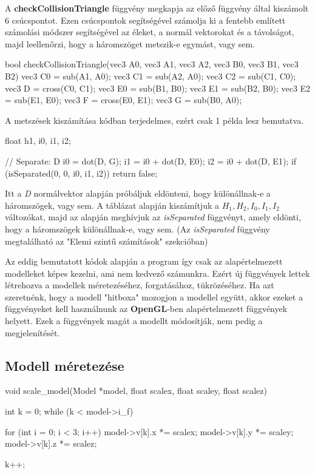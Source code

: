 \newpage

A \textbf{checkCollisionTriangle} függvény megkapja az előző függvény által kiszámolt 6 csúcspontot. Ezen csúcspontok segítségével számolja ki a fentebb említett számolási módszer segítségével az éleket, a normál vektorokat és a távolságot, majd leellenőrzi, hogy a háromszöget metszik-e egymást, vagy sem.

\begin{cpp}
bool checkCollisionTriangle(vec3 A0, vec3 A1, vec3 A2, vec3 B0,
vec3 B1, vec3 B2)
{
    vec3 C0 = sub(A1, A0);
    vec3 C1 = sub(A2, A0);
    vec3 C2 = sub(C1, C0);
    vec3 D = cross(C0, C1);
    vec3 E0 = sub(B1, B0);
    vec3 E1 = sub(B2, B0);
    vec3 E2 = sub(E1, E0);
    vec3 F = cross(E0, E1);
    vec3 G = sub(B0, A0);
}
\end{cpp}

A metszések kiszámítása kódban terjedelmes, ezért csak 1 példa lesz bemutatva.

\begin{cpp}
float h1, i0, i1, i2;
	
// Separate: D
i0 = dot(D, G);
i1 = i0 + dot(D, E0);
i2 = i0 + dot(D, E1);
if (isSeparated(0, 0, i0, i1, i2))
{
    return false;
}
\end{cpp}

Itt a \textit{D} normálvektor alapján próbáljuk eldönteni, hogy különállnak-e a háromszögek, vagy sem. A táblázat alapján kiszámítjuk a \textit{$H_1, H_2, I_0, I_1, I_2$} változókat, majd az alapján meghívjuk az \textit{isSeparated} függvényt, amely eldönti, hogy a háromszögek különállnak-e, vagy sem. (Az \textit{isSeparated} függvény megtalálható az "Elemi szintű számítások" szekcióban)
\newpage


Az eddig bemutatott kódok alapján a program így csak az alapértelmezett modelleket képes kezelni, ami nem kedvező számunkra. Ezért új függvények lettek létrehozva a modellek méretezéséhez, forgatásához, tükrözéséhez. Ha azt szeretnénk, hogy a modell "hitboxa" mozogjon a modellel együtt, akkor ezeket a függvényeket kell használnunk az \textbf{OpenGL}-ben alapértelmezett függvények helyett. Ezek a függvények magát a modellt módosítják, nem pedig a megjelenítését.

\subsection{Modell méretezése}

\begin{cpp}
void scale_model(Model *model, float scalex, float scaley, 
float scalez)
{
    int k = 0;
    while (k < model->i_f)
    {
        for (int i = 0; i < 3; i++)
        {
            model->v[k].x *= scalex;
            model->v[k].y *= scaley;
            model->v[k].z *= scalez;
        }
			
        k++;
    }
}
\end{cpp}

